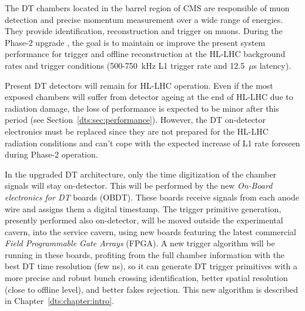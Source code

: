 \documentclass[../main.tex]{subfiles}
\begin{document}
The DT chambers located in the barrel region of CMS are responsible of muon detection and precise momentum measurement over a wide range of energies. They provide identification, reconstruction and trigger
on muons. During the Phase-2 upgrade \cite{muontdr, l1tdr}, the goal is to maintain or improve the present system performance for trigger and offline reconstruction at the HL-LHC background rates and trigger conditions (500-750~kHz L1 trigger rate and 12.5~$\mu$s latency).

Present DT detectors will remain for HL-LHC operation. Even if the most exposed chambers will suffer from detector ageing at the end of HL-LHC due to radiation damage, the loss of performance is expected to be minor after this period (see Section~\ref{dts:sec:performance}). However, the DT on-detector electronics must be replaced since they are not prepared for the HL-LHC radiation conditions and can't cope with the expected increase of L1 rate foreseen during Phase-2 operation.

In the upgraded DT architecture, only the time digitization of the chamber signals will stay on-detector. This will be performed by the new \textit{On-Board electronics for DT} boards (OBDT). These boards receive signals from each anode wire and assigns them a digital timestamp. The trigger primitive generation, presently performed also on-detector, will be moved outside the experimental cavern, into the service cavern, using new boards featuring the latest commercial \textit{Field Programmable Gate Arrays} (FPGA). A new trigger algorithm will be running in these boards, profiting from the full chamber information with the best DT time resolution (few ns), so it can generate DT trigger primitives with a more precise and robust bunch crossing identification, better spatial resolution (close to offline level), and better fakes rejection. This new algorithm is described in Chapter~\ref{dts:chapter:intro}.




%
%
\end{document}
